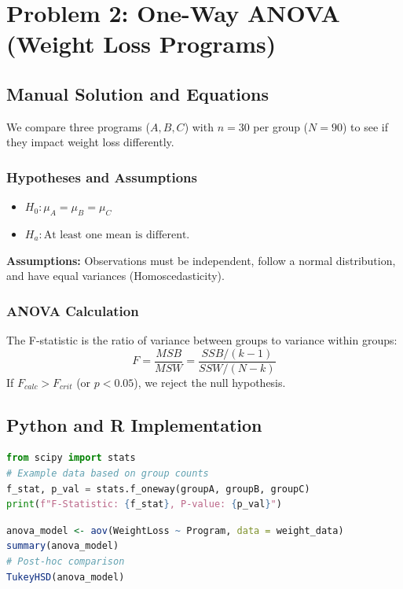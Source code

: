 \documentclass[12pt]{article}
\begin{document}
\newpage
\section{Problem 2: One-Way ANOVA (Weight Loss Programs)}
\label{prob2}

\subsection{Manual Solution and Equations}
We compare three programs ($A, B, C$) with $n=30$ per group ($N=90$) to see if they impact weight loss differently.

\subsubsection{Hypotheses and Assumptions}
\begin{itemize}
    \item $H_0: \mu_A = \mu_B = \mu_C$
    \item $H_a: \text{At least one mean is different.}$
\end{itemize}
\textbf{Assumptions:} Observations must be independent, follow a normal distribution, and have equal variances (Homoscedasticity).

\subsubsection{ANOVA Calculation}

The F-statistic is the ratio of variance between groups to variance within groups:
\[ F = \frac{MSB}{MSW} = \frac{SSB/(k-1)}{SSW/(N-k)} \]
If $F_{calc} > F_{crit}$ (or $p < 0.05$), we reject the null hypothesis.

\subsection{Python and R Implementation}
\begin{lstlisting}[language=Python, caption=Python ANOVA for Problem 2]
from scipy import stats
# Example data based on group counts
f_stat, p_val = stats.f_oneway(groupA, groupB, groupC)
print(f"F-Statistic: {f_stat}, P-value: {p_val}")
\end{lstlisting}

\begin{lstlisting}[language=R, caption=R ANOVA for Problem 2]
anova_model <- aov(WeightLoss ~ Program, data = weight_data)
summary(anova_model)
# Post-hoc comparison
TukeyHSD(anova_model)
\end{lstlisting}
\end{document}
